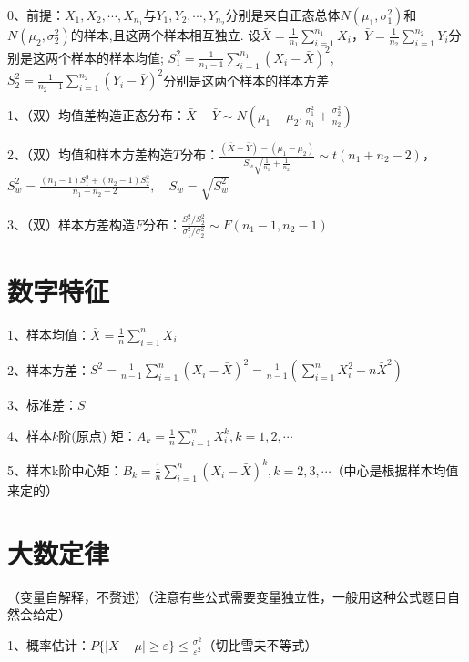 0、前提：$X_{1}, X_{2}, \cdots, X_{n_{1}}$与$Y_{1}, Y_{2}, \cdots,Y_{n_{2}}$分别是来自正态总体$N\left(\mu_{1}, \sigma_{1}^{2}\right)$和$N\left(\mu_{2}, \sigma_{2}^{2}\right)$的样本,且这两个样本相互独立. 设$\bar{X}=\frac{1}{n_{1}} \sum_{i=1}^{n_{1}} X_{i}$，$\bar{Y}=\frac{1}{n_{2}} \sum_{i=1}^{n_{2}} Y_{i}$分别是这两个样本的样本均值; $S_{1}^{2}=\frac{1}{n_{1}-1} \sum_{i=1}^{n_{1}}\left(X_{i}-\bar{X}\right)^{2}$, $S_{2}^{2}=\frac{1}{n_{2}-1} \sum_{i=1}^{n_{2}}\left(Y_{i}-\bar{Y}\right)^{2}$分别是这两个样本的样本方差

1、（双）均值差构造正态分布：$\bar{X}-\bar{Y} \sim N\left(\mu_{1}-\mu_{2}, \frac{\sigma_{1}^{2}}{n_{1}}+\frac{\sigma_{2}^{2}}{n_{2}}\right)$

2、（双）均值和样本方差构造$T$分布：$\frac{(\bar{X}-\bar{Y})-\left(\mu_{1}-\mu_{2}\right)}{S_{w} \sqrt{\frac{1}{n_{1}}+\frac{1}{n_{2}}}} \sim t\left(n_{1}+n_{2}-2\right)$，$S_{w}^{2}=\frac{\left(n_{1}-1\right) S_{1}^{2}+\left(n_{2}-1\right) S_{2}^{2}}{n_{1}+n_{2}-2}, \quad S_{w}=\sqrt{S_{w}^{2}}$

3、（双）样本方差构造$F$分布：$\frac{S_{1}^{2} / S_{2}^{2}}{\sigma_{1}^{2} / \sigma_{2}^{2}} \sim F\left(n_{1}-1, n_{2}-1\right)$

\section{数字特征}

1、样本均值：$\bar{X}=\frac{1}{n} \sum_{i=1}^{n} X_{i}$

2、样本方差：$S^{2}=\frac{1}{n-1} \sum_{i=1}^{n}\left(X_{i}-\bar{X}\right)^{2}=\frac{1}{n-1}\left(\sum_{i=1}^{n} X_{i}^{2}-n \bar{X}^{2}\right)$

3、标准差：$S$

4、样本$k$阶(原点) 矩：$A_{k}=\frac{1}{n} \sum_{i=1}^{n} X_{i}^{k}, k=1,2, \cdots$

5、样本k阶中心矩：$B_{k}=\frac{1}{n} \sum_{i=1}^{n}\left(X_{i}-\bar{X}\right)^{k}, k=2,3, \cdots$（中心是根据样本均值来定的）

\section{大数定律}

（变量自解释，不赘述）（注意有些公式需要变量独立性，一般用这种公式题目自然会给定）

1、概率估计：$P\{|X-\mu| \geqslant \varepsilon\} \leqslant \frac{\sigma^{2}}{\varepsilon^{2}}$（切比雪夫不等式）

